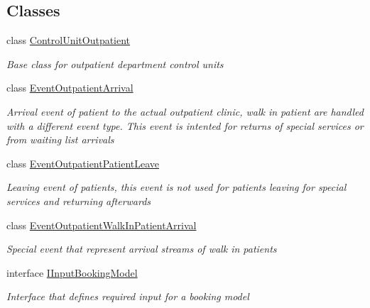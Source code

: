 \subsection*{Classes}
\begin{DoxyCompactItemize}
\item 
class \hyperlink{class_general_health_care_elements_1_1_department_models_1_1_outpatient_1_1_control_unit_outpatient}{Control\+Unit\+Outpatient}
\begin{DoxyCompactList}\small\item\em Base class for outpatient department control units \end{DoxyCompactList}\item 
class \hyperlink{class_general_health_care_elements_1_1_department_models_1_1_outpatient_1_1_event_outpatient_arrival}{Event\+Outpatient\+Arrival}
\begin{DoxyCompactList}\small\item\em Arrival event of patient to the actual outpatient clinic, walk in patient are handled with a different event type. This event is intented for returns of special services or from waiting list arrivals \end{DoxyCompactList}\item 
class \hyperlink{class_general_health_care_elements_1_1_department_models_1_1_outpatient_1_1_event_outpatient_patient_leave}{Event\+Outpatient\+Patient\+Leave}
\begin{DoxyCompactList}\small\item\em Leaving event of patients, this event is not used for patients leaving for special services and returning afterwards \end{DoxyCompactList}\item 
class \hyperlink{class_general_health_care_elements_1_1_department_models_1_1_outpatient_1_1_event_outpatient_walk_in_patient_arrival}{Event\+Outpatient\+Walk\+In\+Patient\+Arrival}
\begin{DoxyCompactList}\small\item\em Special event that represent arrival streams of walk in patients \end{DoxyCompactList}\item 
interface \hyperlink{interface_general_health_care_elements_1_1_department_models_1_1_outpatient_1_1_i_input_booking_model}{I\+Input\+Booking\+Model}
\begin{DoxyCompactList}\small\item\em Interface that defines required input for a booking model \end{DoxyCompactList}\item 

\end{DoxyCompactItemize}
